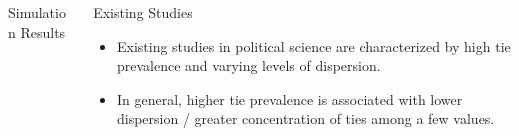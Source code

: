 \documentclass[structurebold,final,hyperref=pdftex,bookmarks,colorlinks,breaklinks]{beamer}
\begin{document}
\begin{frame}
\begin{columns}[t]
\begin{column}{0.24\linewidth}
\begin{block}{Simulation Results}
      \end{block}

    \end{column}%

    \begin{column}{0.24\linewidth}

      \begin{block}{Existing Studies}
      \begin{itemize}
      \item Existing studies in political science are characterized by high tie prevalence and varying levels of dispersion.
      \item In general, higher tie prevalence is associated with lower dispersion / greater concentration of ties among a few values.
      \end{itemize}

        \begin{figure}[h]
        \begin{center}
        \end{center}
        \end{figure}



\end{block}
\end{column}
\end{columns}
\end{frame}
\end{document}
